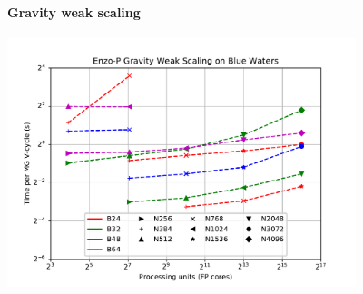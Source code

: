 %
%
\begin{frame}[fragile,label=ss-recent-gravity] 
\secframetitle{\ssRecentGravity}
\framesubtitle{Gravity weak scaling}
  \begin{center}
    \vspace{-0.1in}
    \begin{minipage}{4.5in}
      \begin{center}
        \begin{minipage}{4.in}
          \includegraphics[width=4.0in]{scale-multigrid-weak.pdf}
        \end{minipage} \ 
      \end{center}
    \end{minipage}
  \end{center}
\end{frame}

